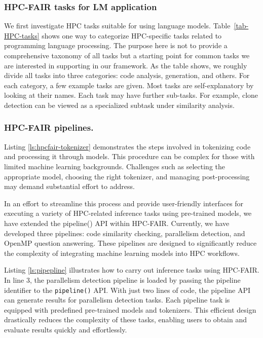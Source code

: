 \subsubsection{HPC-FAIR tasks for LM application}
We first investigate HPC tasks suitable for using language models.
Table~\ref{tab-HPC-tasks} shows one way to categorize HPC-specific tasks related to programming language processing. The purpose here is not to provide a comprehensive taxonomy of all tasks but a starting point for common tasks we are interested in supporting in our framework. As the table shows, we roughly divide all tasks into three categories: code analysis, generation, and others. For each category, a few example tasks are given. Most tasks are self-explanatory by looking at their names. Each task may have further sub-tasks. For example, clone detection can be viewed as a specialized subtask under similarity analysis. 
\subsubsection{HPC-FAIR pipelines.}
Listing \ref{ls:hpcfair-tokenizer} demonstrates the steps involved in tokenizing code and processing it through models. This procedure can be complex for those with limited machine learning backgrounds. Challenges such as selecting the appropriate model, choosing the right tokenizer, and managing post-processing may demand substantial effort to address.

In an effort to streamline this process and provide user-friendly interfaces for executing a variety of HPC-related inference tasks using pre-trained models, we have extended the \face pipeline() API within HPC-FAIR. Currently, we have developed three pipelines: code similarity checking, parallelism detection, and OpenMP question answering. These pipelines are designed to significantly reduce the complexity of integrating machine learning models into HPC workflows.

Listing \ref{ls:pipepline} illustrates how to carry out inference tasks using HPC-FAIR. In line 3, the parallelism detection pipeline is loaded by passing the pipeline identifier to the \texttt{pipeline()} API. 
With just two lines of code, the pipeline API can generate results for parallelism detection tasks. Each pipeline task is equipped with predefined pre-trained models and tokenizers. This efficient design drastically reduces the complexity of these tasks, enabling users to obtain and evaluate results quickly and effortlessly.

